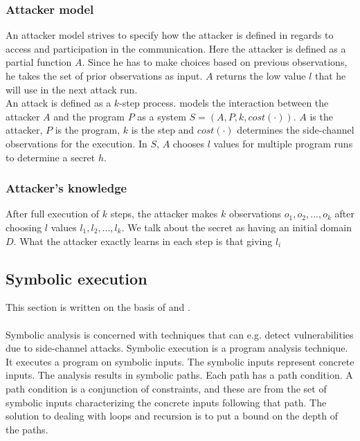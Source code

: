 \documentclass[11pt,a4paper,notitlepage]{article}
\begin{document}
\subsubsection{Attacker model}

An attacker model strives to specify how the attacker is defined in regards to access and participation in the communication. Here the attacker is defined as a partial function $A$. Since he has to make choices based on previous observations, he takes the set of prior observations as input. $A$ returns the low value $l$ that he will use in the next attack run. 
\\An attack is defined as a $k$-step process. \cite{phan2017synthesis} models the interaction between the attacker $A$ and the program $P$ as a system $S = (A,P,k,cost(\cdot))$. $A$ is the attacker, $P$ is the program, $k$ is the step and $cost(\cdot)$ determines the side-channel observations for the execution. In $S$, $A$ chooses $l$ values for multiple program runs to determine a secret $h$. 

\subsubsection{Attacker's knowledge}

After full execution of $k$ steps, the attacker makes $k$ observations $o_1,o_2,...,o_k$ after choosing $l$ values $l_1,l_2,...,l_k$. We talk about the secret as having an initial domain $D$. What the attacker exactly learns in each step is that giving $l_i$ 

\subsection{Symbolic execution}
\label{sec:symbolicexecution}
This section is written on the basis of \cite{phan2017synthesis} and \cite{malacaria2018symbolic}.
\\\\
Symbolic analysis is concerned with techniques that can e.g. detect vulnerabilities due to side-channel attacks. Symbolic execution is a program analysis technique. It executes a program on symbolic inputs. The symbolic inputs represent concrete inputs. The analysis results in symbolic paths. Each path has a path condition. A path condition is a conjunction of constraints, and these are from the set of symbolic inputs characterizing the concrete inputs following that path. The solution to dealing with loops and recursion is to put a bound on the depth of the paths.  
\end{document}
